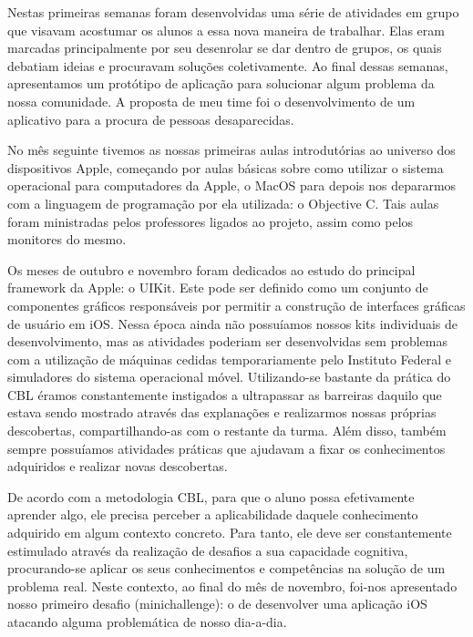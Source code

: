 \documentclass[
	12pt,				%
	openright,			%
	twoside,			%
	a4paper,			%
	english,			%
	french,				%
	spanish,			%
	brazil,				%
	]{abntex2}
\begin{document}
Nestas primeiras semanas foram desenvolvidas uma série de atividades em grupo que visavam acostumar os alunos a essa nova maneira de trabalhar. Elas eram marcadas principalmente por seu desenrolar se dar dentro de grupos, os quais debatiam ideias e procuravam soluções coletivamente. Ao final dessas semanas, apresentamos um protótipo de aplicação para solucionar algum problema da nossa comunidade. A proposta de meu time foi o desenvolvimento de um aplicativo para a procura de pessoas desaparecidas. 

No mês seguinte tivemos as nossas primeiras aulas introdutórias ao universo dos dispositivos Apple, começando por aulas básicas sobre como utilizar o sistema operacional para computadores da Apple, o MacOS para depois nos depararmos com a linguagem de programação por ela utilizada: o Objective C. Tais aulas foram ministradas pelos professores ligados ao projeto, assim como pelos monitores do mesmo.

Os meses de outubro e novembro foram dedicados ao estudo do principal framework da Apple: o UIKit. Este pode ser definido como um conjunto de componentes gráficos responsáveis por permitir a construção de interfaces gráficas de usuário em iOS. Nessa época ainda não possuíamos nossos kits individuais de desenvolvimento, mas as atividades poderiam ser desenvolvidas sem problemas com a utilização de máquinas cedidas temporariamente pelo Instituto Federal e simuladores do sistema operacional móvel. Utilizando-se bastante da prática do CBL éramos constantemente instigados a ultrapassar as barreiras daquilo que estava sendo mostrado através das explanações e realizarmos nossas próprias descobertas, compartilhando-as com o restante da turma. Além disso, também sempre possuíamos atividades práticas que ajudavam a fixar os conhecimentos adquiridos e realizar novas descobertas.

De acordo com a metodologia CBL, para que o aluno possa efetivamente aprender algo, ele precisa perceber a aplicabilidade daquele conhecimento adquirido em algum contexto concreto. Para tanto, ele deve ser constantemente estimulado através da realização de desafios a sua capacidade cognitiva, procurando-se aplicar os seus conhecimentos e competências na solução de um problema real. Neste contexto, ao final do mês de novembro, foi-nos apresentado nosso primeiro desafio (minichallenge): o de desenvolver uma aplicação iOS atacando alguma problemática de nosso dia-a-dia.
\end{document}

